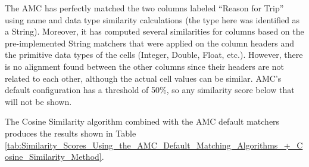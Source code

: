 The AMC has perfectly matched the two columns labeled ``Reason for Trip'' using name and data type similarity calculations (the type here was identified as a String). Moreover, it has computed several similarities for columns based on the pre-implemented String matchers that were applied on the column headers and the primitive data types of the cells (Integer, Double, Float, etc.). However, there is no alignment found between the other columns since their headers are not related to each other, although the actual cell values can be similar. AMC's default configuration has a threshold of 50\%, so any similarity score below that will not be shown.

The Cosine Similarity algorithm combined with the AMC default matchers produces the results shown in Table \ref{tab:Similarity_Scores_Using_the_AMC_Default_Matching_Algorithms_+_Cosine_Similarity_Method}.

